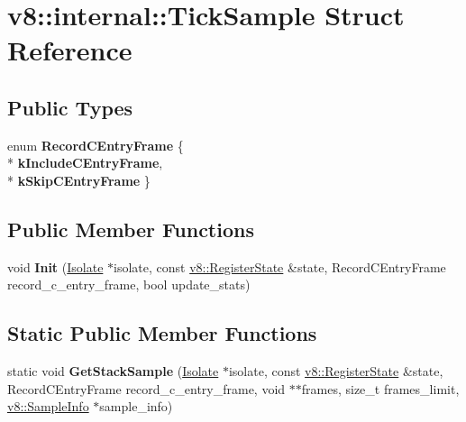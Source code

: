 \hypertarget{structv8_1_1internal_1_1_tick_sample}{}\section{v8\+:\+:internal\+:\+:Tick\+Sample Struct Reference}
\label{structv8_1_1internal_1_1_tick_sample}
\subsection*{Public Types}
\begin{DoxyCompactItemize}
\item 
enum {\bfseries Record\+C\+Entry\+Frame} \{ \\*
{\bfseries k\+Include\+C\+Entry\+Frame}, 
\\*
{\bfseries k\+Skip\+C\+Entry\+Frame}
 \}\hypertarget{structv8_1_1internal_1_1_tick_sample_a83e83599fa86f30e0761b741065d4bcb}{}\label{structv8_1_1internal_1_1_tick_sample_a83e83599fa86f30e0761b741065d4bcb}

\end{DoxyCompactItemize}
\subsection*{Public Member Functions}
\begin{DoxyCompactItemize}
\item 
void {\bfseries Init} (\hyperlink{classv8_1_1internal_1_1_isolate}{Isolate} $\ast$isolate, const \hyperlink{structv8_1_1_register_state}{v8\+::\+Register\+State} \&state, Record\+C\+Entry\+Frame record\+\_\+c\+\_\+entry\+\_\+frame, bool update\+\_\+stats)\hypertarget{structv8_1_1internal_1_1_tick_sample_a92098700c69500bcd3d4f26913c1f107}{}\label{structv8_1_1internal_1_1_tick_sample_a92098700c69500bcd3d4f26913c1f107}

\end{DoxyCompactItemize}
\subsection*{Static Public Member Functions}
\begin{DoxyCompactItemize}
\item 
static void {\bfseries Get\+Stack\+Sample} (\hyperlink{classv8_1_1internal_1_1_isolate}{Isolate} $\ast$isolate, const \hyperlink{structv8_1_1_register_state}{v8\+::\+Register\+State} \&state, Record\+C\+Entry\+Frame record\+\_\+c\+\_\+entry\+\_\+frame, void $\ast$$\ast$frames, size\+\_\+t frames\+\_\+limit, \hyperlink{structv8_1_1_sample_info}{v8\+::\+Sample\+Info} $\ast$sample\+\_\+info)\hypertarget{structv8_1_1internal_1_1_tick_sample_a1ce8caa48c5c563daadc14ef6a932d76}{}\label{structv8_1_1internal_1_1_tick_sample_a1ce8caa48c5c563daadc14ef6a932d76}

\end{DoxyCompactItemize}
